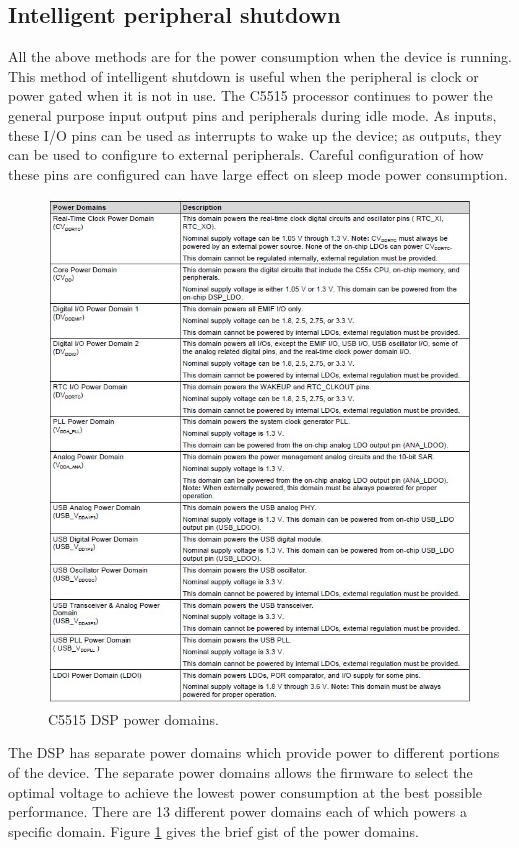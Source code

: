 \subsection{Intelligent peripheral shutdown}
All the above methods are for the power consumption when the device is running. This method of intelligent shutdown is useful when the peripheral is clock or power gated when it is not in use. The C5515 processor continues to power the general purpose input output pins and peripherals during idle mode. As inputs, these I/O pins can be used as interrupts to wake 
up the device; as outputs, they can be used to configure to external peripherals. Careful configuration of how these pins are configured can have large effect on sleep mode power consumption. 
\begin{figure}[h]
	\centering
	\includegraphics[scale = 0.5 ]{power_domain.JPG}
	\caption{C5515 DSP power domains. \cite{appref}\label{power_domain}}
\end{figure}
The DSP has separate power domains which provide power to different portions of the device. The separate power domains allows the firmware to select the optimal voltage to achieve the lowest power consumption at the best possible performance. There are 13 different power domains each of which powers a specific domain. Figure \ref{power_domain} gives the brief gist of the power domains.



